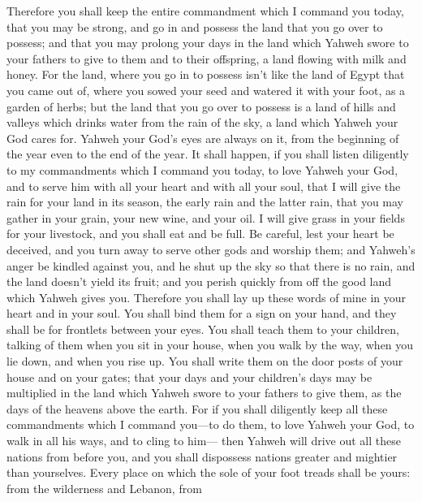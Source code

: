  Therefore you shall keep the entire commandment which I
command you today, that you may be strong, and go in and possess the
land that you go over to possess;  and that you may prolong
your days in the land which Yahweh swore to your fathers to give to them
and to their offspring, a land flowing with milk and honey.
 For the land, where you go in to possess isn't like the
land of Egypt that you came out of, where you sowed your seed and
watered it with your foot, as a garden of herbs;  but the
land that you go over to possess is a land of hills and valleys which
drinks water from the rain of the sky,  a land which Yahweh
your God cares for. Yahweh your God's eyes are always on it, from the
beginning of the year even to the end of the year.  It
shall happen, if you shall listen diligently to my commandments which I
command you today, to love Yahweh your God, and to serve him with all
your heart and with all your soul,  that I will give the
rain for your land in its season, the early rain and the latter rain,
that you may gather in your grain, your new wine, and your oil.
 I will give grass in your fields for your livestock, and
you shall eat and be full.  Be careful, lest your heart be
deceived, and you turn away to serve other gods and worship them;
 and Yahweh's anger be kindled against you, and he shut up
the sky so that there is no rain, and the land doesn't yield its fruit;
and you perish quickly from off the good land which Yahweh gives you.
 Therefore you shall lay up these words of mine in your
heart and in your soul. You shall bind them for a sign on your hand, and
they shall be for frontlets between your eyes.  You shall
teach them to your children, talking of them when you sit in your house,
when you walk by the way, when you lie down, and when you rise up.
 You shall write them on the door posts of your house and
on your gates;  that your days and your children's days may
be multiplied in the land which Yahweh swore to your fathers to give
them, as the days of the heavens above the earth.  For if
you shall diligently keep all these commandments which I command
you---to do them, to love Yahweh your God, to walk in all his ways, and
to cling to him---  then Yahweh will drive out all these
nations from before you, and you shall dispossess nations greater and
mightier than yourselves.  Every place on which the sole of
your foot treads shall be yours: from the wilderness and Lebanon, from
